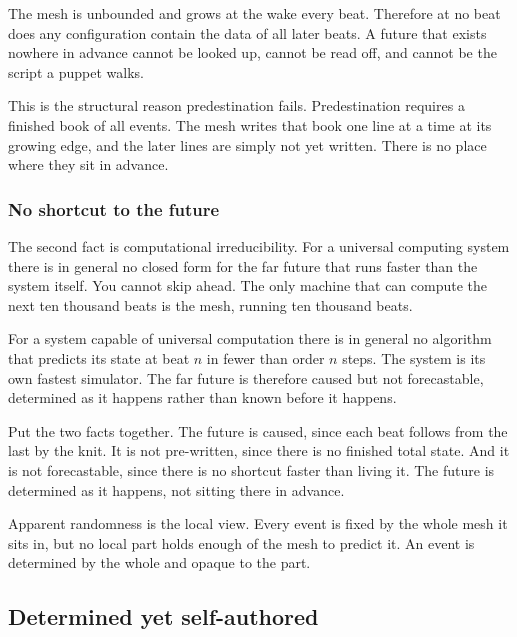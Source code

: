 \begin{proposition}
The mesh is unbounded and grows at the wake every beat. Therefore at no beat does any configuration contain the data of all later beats. A future that exists nowhere in advance cannot be looked up, cannot be read off, and cannot be the script a puppet walks.
\end{proposition}

This is the structural reason predestination fails. Predestination requires a finished book of all events. The mesh writes that book one line at a time at its growing edge, and the later lines are simply not yet written. There is no place where they sit in advance.

\subsubsection{No shortcut to the future}

The second fact is computational irreducibility. For a universal computing system there is in general no closed form for the far future that runs faster than the system itself. You cannot skip ahead. The only machine that can compute the next ten thousand beats is the mesh, running ten thousand beats.

\begin{theorem}
For a system capable of universal computation there is in general no algorithm that predicts its state at beat $n$ in fewer than order $n$ steps. The system is its own fastest simulator. The far future is therefore caused but not forecastable, determined as it happens rather than known before it happens.
\end{theorem}

Put the two facts together. The future is caused, since each beat follows from the last by the knit. It is not pre-written, since there is no finished total state. And it is not forecastable, since there is no shortcut faster than living it. The future is determined as it happens, not sitting there in advance.

\begin{principle}
Apparent randomness is the local view. Every event is fixed by the whole mesh it sits in, but no local part holds enough of the mesh to predict it. An event is determined by the whole and opaque to the part.
\end{principle}

\subsection{Determined yet self-authored}

